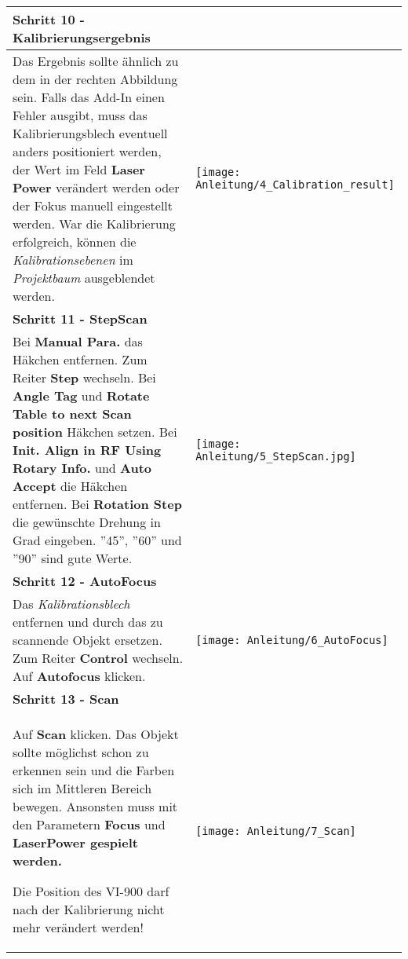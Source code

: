 \begin{longtable}{|>{\RaggedRight}m{5cm}|m{8cm}|}
\multicolumn{2}{|l|}%
{{\textbf{Schritt 10 - Kalibrierungsergebnis}}}
\\ \hline
Das Ergebnis sollte ähnlich zu dem in der rechten Abbildung sein. \linebreak
Falls das Add-In einen Fehler ausgibt, muss das Kalibrierungsblech eventuell anders positioniert werden, der Wert im Feld \textbf{Laser Power} verändert werden oder der Fokus manuell eingestellt werden.\linebreak
War die Kalibrierung erfolgreich, können die \emph{Kalibrationsebenen} im \emph{Projektbaum} ausgeblendet werden.
& 
\texttt{[image: Anleitung/4\_Calibration\_result]}
\\ \hline  

\pagebreak

\multicolumn{2}{|l|}%
{{\textbf{Schritt 11 - StepScan}}}
\\ \hline
Bei \textbf{Manual Para.} das Häkchen entfernen.\linebreak
Zum Reiter \textbf{Step} wechseln.\linebreak
Bei \textbf{Angle Tag} und \textbf{Rotate Table to next Scan position} Häkchen setzen.\linebreak
Bei \textbf{Init. Align in RF Using Rotary Info.} und \textbf{Auto Accept} die Häkchen entfernen.\linebreak
Bei \textbf{Rotation Step} die gewünschte Drehung in Grad eingeben. \linebreak
''45'', ''60'' und ''90'' sind gute Werte.
& 
\texttt{[image: Anleitung/5\_StepScan.jpg]}
\\ \hline  

\multicolumn{2}{|l|}%
{{\textbf{Schritt 12 - AutoFocus}}}
\\ \hline
Das \emph{Kalibrationsblech} entfernen und durch das zu scannende Objekt ersetzen.\linebreak
Zum Reiter \textbf{Control} wechseln. \linebreak
Auf \textbf{Autofocus} klicken.\linebreak
& 
\texttt{[image: Anleitung/6\_AutoFocus]}
\\ \hline  

\pagebreak

\multicolumn{2}{|l|}%
{{\textbf{Schritt 13 - Scan}}}
\\ \hline
Auf \textbf{Scan} klicken. \linebreak
Das Objekt sollte möglichst schon zu erkennen sein und die Farben sich im Mittleren Bereich bewegen. \linebreak
Ansonsten muss mit den Parametern \textbf{Focus} und \textbf{LaserPower gespielt werden.}
\begin{TippS}Die Position des VI-900 darf nach der Kalibrierung nicht mehr verändert werden!\end{TippS}
& 
\texttt{[image: Anleitung/7\_Scan]}
\\ \hline  


\end{longtable}
